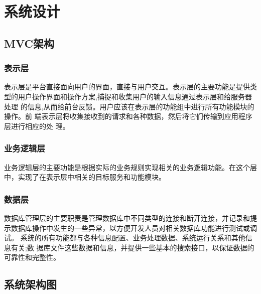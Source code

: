 \section{系统设计}
\subsection{MVC架构}
\subsubsection{表示层}
表示层是平台直接面向用户的界面，直接与用户交互。表示层的主要功能是提供类
型的用户操作界面和操作方案,捕捉和收集用户的输入信息通过表示层和给服务器处理
的信息,从而给前台反馈。用户应该在表示层的功能组中进行所有功能模块的操作。前
端表示层将收集接收到的请求和各种数据，然后将它们传输到应用程序层进行相应的处
理。
\subsubsection{业务逻辑层}
业务逻辑层的主要功能是根据实际的业务规则实现相关的业务逻辑功能。在这个层
中，实现了在表示层中相关的目标服务和功能模块。

\subsubsection{数据层}
数据库管理层的主要职责是管理数据库中不同类型的连接和断开连接，并记录和提
示数据库操作中发生的一些异常，以方便开发人员对相关数据库功能进行测试或调试。
系统的所有功能都与各种信息配置、业务处理数据、系统运行关系和其他信息有关;数
据库文件这些数据和信息，并提供一些基本的搜索接口，以保证数据的可靠性和完整性。


\subsection{系统架构图}

